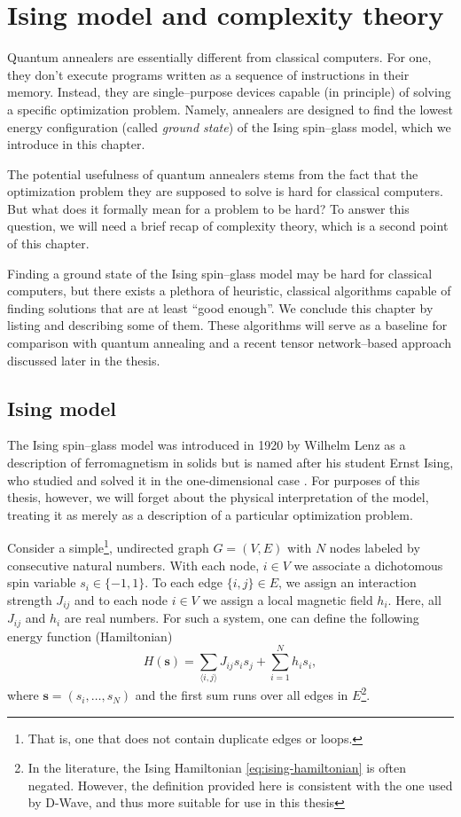 \chapter{Ising model and complexity theory}


Quantum annealers are essentially different from classical computers. For one, they don't
execute programs written as a sequence of instructions in their memory. Instead, they are
single--purpose devices capable (in principle) of solving a specific optimization problem.
Namely, annealers are designed to find the lowest energy configuration (called \emph{ground state})
of the Ising spin--glass model, which we introduce in this chapter.

The potential usefulness of quantum annealers stems from the fact that the optimization problem they
are supposed to solve is hard for classical computers. But what does it formally mean for a problem
to be hard? To answer this question, we will need a brief recap of complexity theory, which is a
second point of this chapter.

Finding a ground state of the Ising spin--glass model may be hard for classical computers, but
there exists a plethora of heuristic, classical algorithms capable of finding solutions that are at
least ``good enough''. We conclude this chapter by listing and describing some of them.
These algorithms will serve as a baseline for comparison with quantum annealing and a recent
tensor network--based approach discussed later in the thesis.

\section{Ising model}

The Ising spin--glass model was introduced in 1920 by Wilhelm Lenz \cite{lenz} as a description of
ferromagnetism in solids but is named after his student Ernst Ising, who studied and solved it in
the one-dimensional case \cite{ising}. For purposes of this thesis, however, we will forget about
the physical interpretation of the model, treating it as merely as a description of a particular
optimization problem.

Consider a simple\footnote{That is, one that does not contain duplicate edges or loops.}, undirected
graph $G = (V, E)$ with $N$ nodes labeled by consecutive natural numbers.  With each node, $i \in V$
we associate a dichotomous spin variable $s_i \in \{-1, 1\}$. To each edge $\{i, j\} \in E$, we
assign an interaction strength $J_{ij}$ and to each node $i \in V$ we assign a local magnetic field
$h_i$. Here, all $J_{ij}$ and $h_i$ are real numbers. For such a system, one can define the
following energy function (Hamiltonian)
\begin{equation}
\label{eq:ising-hamiltonian}
H(\mathbf{s}) = \sum_{\langle i, j \rangle} J_{ij} s_i s_j +  \sum_{i=1}^N h_i s_i,
\end{equation}
where $\mathbf{s} = (s_i, \ldots, s_N)$ and the first sum runs over all edges in $E$\footnote{In the
literature, the Ising Hamiltonian \eqref{eq:ising-hamiltonian} is often negated. However, the
definition provided here is consistent with the one used by D-Wave, and thus more suitable for use
in this thesis}.


